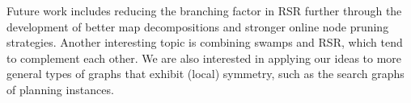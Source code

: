 
\par
Future work includes reducing the branching factor in RSR further through the 
development of better map decompositions and stronger online node pruning
strategies.
Another interesting topic is combining swamps and RSR, which tend to complement each other.
We are also interested in applying our ideas to more general types of graphs that exhibit
(local) symmetry, such as the search graphs of planning instances.


